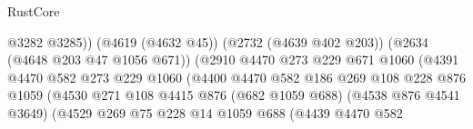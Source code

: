 \begin{lexlean}{RustCore}
\begin{coremodule}
                                                    @3282
                                                    @3285))
                                                (@4619 (@4632 @45))
                                                (@2732 (@4639 @402 @203))
                                                (@2634 (@4648 @203 @47 @1056 @671))
                                                (@2910
                                                  @4470
                                                  @273
                                                  @229
                                                  @671
                                                  @1060
                                                  (@4391
                                                    @4470
                                                    @582
                                                    @273
                                                    @229
                                                    @1060
                                                    (@4400
                                                      @4470
                                                      @582
                                                      @186
                                                      @269
                                                      @108
                                                      @228
                                                      @876
                                                      @1059
                                                      (@4530
                                                        @271
                                                        @108
                                                        @4415
                                                        @876
                                                        (@682 @1059 @688)
                                                        (@4538 @876 @4541 @3649)
                                                        (@4529
                                                          @269
                                                          @75
                                                          @228
                                                          @14
                                                          @1059
                                                          @688
                                                          (@4439
                                                            @4470
                                                            @582

\end{coremodule}
\end{lexlean}
